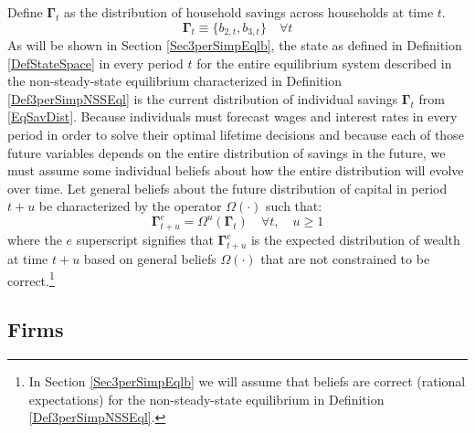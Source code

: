 \documentclass[letterpaper,12pt]{article}
\theoremstyle{definition}
\numberwithin{equation}{section}
\numberwithin{exercise}{section}
\begin{document}
\begin{spacing}{1.5}
      Define $\bm{\Gamma}_t$ as the distribution of household savings across households at time $t$.
      \begin{equation}\label{EqSavDist}
         \bm{\Gamma}_t \equiv \bigl\{b_{2,t},b_{3,t}\bigr\} \quad\forall t
      \end{equation}
      As will be shown in Section \ref{Sec3perSimpEqlb}, the state as defined in Definition \ref{DefStateSpace} in every period $t$ for the entire equilibrium system described in the non-steady-state equilibrium characterized in Definition \ref{Def3perSimpNSSEql} is the current distribution of individual savings $\bm{\Gamma}_t$ from \eqref{EqSavDist}. Because individuals must forecast wages and interest rates in every period in order to solve their optimal lifetime decisions and because each of those future variables depends on the entire distribution of savings in the future, we must assume some individual beliefs about how the entire distribution will evolve over time. Let general beliefs about the future distribution of capital in period $t+u$ be characterized by the operator $\Omega(\cdot)$ such that:
      \begin{equation}\label{EqBeliefs}
         \bm{\Gamma}^e_{t+u} = \Omega^u\left(\bm{\Gamma}_t\right) \quad \forall t, \quad u\geq 1
      \end{equation}
      where the $e$ superscript signifies that $\bm{\Gamma}^e_{t+u}$ is the expected distribution of wealth at time $t+u$ based on general beliefs $\Omega(\cdot)$ that are not constrained to be correct.\footnote{In Section \ref{Sec3perSimpEqlb} we will assume that beliefs are correct (rational expectations) for the non-steady-state equilibrium in Definition \ref{Def3perSimpNSSEql}.}


   \subsection{Firms}\label{Sec3perSimpFirms}


\end{spacing}
\end{document}
